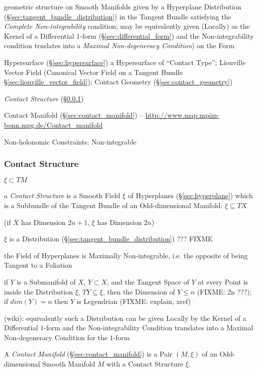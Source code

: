 geometric structure on Smooth Manifolds given by a Hyperplane Distribution
(\S\ref{sec:tangent_bundle_distribution}) in the Tangent Bundle satisfying the
\emph{Complete Non-integrability} condition; may be equivalently given
(Locally) as the Kernel of a Differential $1$-form
(\S\ref{sec:differential_form}) and the Non-integrability condition trnslates
into a \emph{Maximal Non-degeneracy Condition}) on the Form

Hypersurface (\S\ref{sec:hypersurface}) a Hypersurface of ``Contact Type'';
Liouville Vector Field (Canonical Vector Field on a Tangent Bundle
\S\ref{sec:liouville_vector_field}); \fist Contact Geometry
(\S\ref{sec:contact_geometry})

\emph{Contact Structure} (\S\ref{sec:contact_structure})

\fist Contact Manifold (\S\ref{sec:contact_manifold}) --
\url{http://www.map.mpim-bonn.mpg.de/Contact_manifold}

Non-holonomic Constraints: Non-integrable



\subsubsection{Contact Structure}\label{sec:contact_structure}

$\xi \subset TM$

a \emph{Contact Structure} is a Smooth Field $\xi$ of Hyperplanes
(\S\ref{sec:hyperplane}) which is a Subbundle of the Tangent Bundle of an
Odd-dimensional Manifold: $\xi \subseteq T X$

(if $X$ has Dimension $2n+1$, $\xi$ has Dimension $2n$) %

$\xi$ is a Distribution (\S\ref{sec:tangent_bundle_distribution}) ??? FIXME

the Field of Hyperplanes is Maximally Non-integrable, i.e. the opposite of
being Tangent to a Foliation

if $Y$ is a Submanifold of $X$, $Y \subset X$, and the Tangent Space of $Y$ at
every Point is inside the Distribution $\xi$, $T Y \subseteq \xi$, then the
Dimension of $Y \leq n$ (FIXME: 2n ???); if $dim(Y) = n$ then $Y$ is Legendrian
(FIXME: explain, xref)

(wiki): equivalently such a Distribution can be given Locally by the Kernel of
a Differential $1$-form and the Non-integrability Condition translates into a
Maximal Non-degeneracy Condition for the $1$-form

A \emph{Contact Manifold} (\S\ref{sec:contact_manifold}) is a Pair $(M,\xi)$ of
an Odd-dimensional Smooth Manifold $M$ with a Contact Structure $\xi$.

